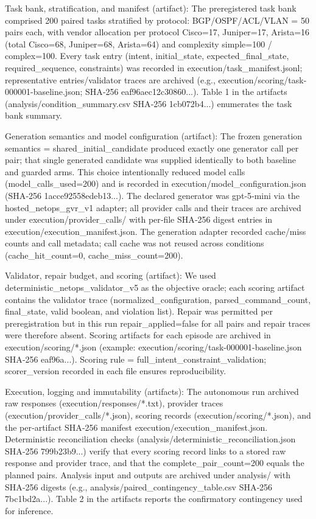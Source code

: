 \documentclass[conference]{IEEEtran}
\begin{document}
Task bank, stratification, and manifest (artifact): The preregistered task bank comprised 200 paired tasks stratified by protocol: BGP/OSPF/ACL/VLAN = 50 pairs each, with vendor allocation per protocol Cisco=17, Juniper=17, Arista=16 (total Cisco=68, Juniper=68, Arista=64) and complexity simple=100 / complex=100. Every task entry (intent, initial\_state, expected\_final\_state, required\_sequence, constraints) was recorded in execution/task\_manifest.jsonl; representative entries/validator traces are archived (e.g., execution/scoring/task-000001-baseline.json; SHA‑256 eaf96aec12c30860...). Table 1 in the artifacts (analysis/condition\_summary.csv SHA‑256 1cb072b4...) enumerates the task bank summary.

Generation semantics and model configuration (artifact): The frozen generation semantics = shared\_initial\_candidate produced exactly one generator call per pair; that single generated candidate was supplied identically to both baseline and guarded arms. This choice intentionally reduced model calls (model\_calls\_used=200) and is recorded in execution/model\_configuration.json (SHA‑256 1acce92558edeb13...). The declared generator was gpt‑5‑mini via the hosted\_netops\_gvr\_v1 adapter; all provider calls and their traces are archived under execution/provider\_calls/ with per‑file SHA‑256 digest entries in execution/execution\_manifest.json. The generation adapter recorded cache/miss counts and call metadata; call cache was not reused across conditions (cache\_hit\_count=0, cache\_miss\_count=200).

Validator, repair budget, and scoring (artifact): We used deterministic\_netops\_validator\_v5 as the objective oracle; each scoring artifact contains the validator trace (normalized\_configuration, parsed\_command\_count, final\_state, valid boolean, and violation list). Repair was permitted per preregistration but in this run repair\_applied=false for all pairs and repair traces were therefore absent. Scoring artifacts for each episode are archived in execution/scoring/*.json (example: execution/scoring/task-000001-baseline.json SHA‑256 eaf96a...). Scoring rule = full\_intent\_constraint\_validation; scorer\_version recorded in each file ensures reproducibility.

Execution, logging and immutability (artifacts): The autonomous run archived raw responses (execution/responses/*.txt), provider traces (execution/provider\_calls/*.json), scoring records (execution/scoring/*.json), and the per‑artifact SHA‑256 manifest execution/execution\_manifest.json. Deterministic reconciliation checks (analysis/deterministic\_reconciliation.json SHA‑256 799b23b9...) verify that every scoring record links to a stored raw response and provider trace, and that the complete\_pair\_count=200 equals the planned pairs. Analysis input and outputs are archived under analysis/ with SHA‑256 digests (e.g., analysis/paired\_contingency\_table.csv SHA‑256 7bc1bd2a...). Table 2 in the artifacts reports the confirmatory contingency used for inference.
\end{document}
